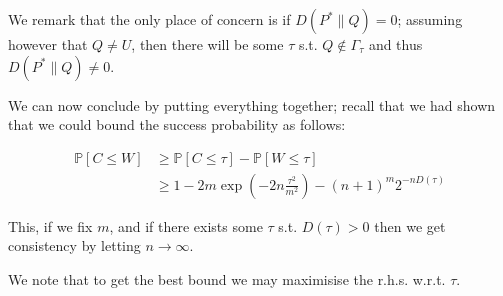 We remark that the only place of concern is if $D\left(P^{*} \| Q\right) = 0$; assuming however that $Q \neq U$, then 
there will be some $\tau$ s.t. $Q \notin \Gamma_\tau$ and thus $D\left(P^{*} \| Q\right) \neq 0$.

We can now conclude by putting everything together; recall that we had shown that we could bound the success probability 
as follows:



\begin{align}
    \mathbb{P}\left[C \leq W\right] &\geq \mathbb{P}\left[C \leq \tau \right] - \mathbb{P}\left[W \leq \tau \right] \\
    &\geq 1 - 2m\exp \left( -2n \frac{\tau^2}{m^2} \right) - (n+1)^{m} 2^{-nD\left( \tau \right)}
\end{align}

This, if we fix $m$, and if there exists some $\tau$ s.t. $D\left( \tau \right) > 0$ then we get consistency
by letting $n \rightarrow \infty$.

We note that to get the best bound we may maximisise the r.h.s. w.r.t. $\tau$.